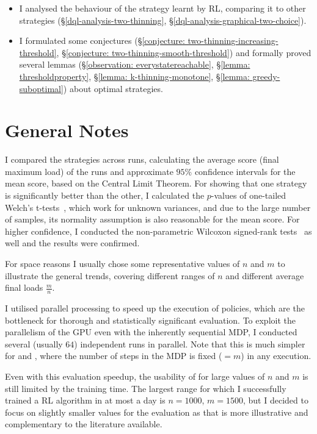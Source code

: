 \begin{itemize}
    \item 
    I analysed the behaviour of the strategy learnt by RL, comparing it to other strategies (\S\ref{dql-analysis-two-thinning}, \S\ref{dql-analysis-graphical-two-choice}).
    \item
    I formulated some conjectures (\S\ref{conjecture: two-thinning-increasing-threshold}, \S\ref{conjecture: two-thinning-smooth-threshold}) and formally proved several lemmas (\S\ref{observation: everystatereachable}, \S\ref{lemma: thresholdproperty}, \S\ref{lemma: k-thinning-monotone}, \S\ref{lemma: greedy-suboptimal}) about optimal strategies.
\end{itemize}


\section{General Notes} \label{evaluationnotes}

I compared the strategies across \NumberofRuns runs, calculating the average score (final maximum load) of the runs and approximate $95\%$ confidence intervals for the mean score, based on the Central Limit Theorem. For showing that one strategy is significantly better than the other, I calculated the $p$-values of one-tailed Welch's t-tests~\cite{welch1947ttest}, which work for unknown variances, and due to the large number of samples, its normality assumption is also reasonable for the mean score. For higher confidence, I conducted the non-parametric Wilcoxon signed-rank tests~\cite{wilcoxon1992test} as well and the results were confirmed.


For space reasons I usually chose some representative values of $n$ and $m$ to illustrate the general trends, covering different ranges of $n$ and different average final loads $\frac{m}{n}$.


I utilised parallel processing to speed up the execution of \DQL policies, which are the bottleneck for thorough and statistically significant evaluation. To exploit the parallelism of the GPU even with the inherently sequential MDP, I conducted several (usually $64$) independent runs in parallel. Note that this is much simpler for \TwoThinning and \GraphicalTwoChoice, where the number of steps in the MDP is fixed ($=m$) in any execution.


Even with this evaluation speedup, the usability of \DQL for large values of $n$ and $m$ is still limited by the training time. The largest range for which I successfully trained a RL algorithm in at most a day is $n=1000$, $m=1500$, but I decided to focus on slightly smaller values for the evaluation as that is more illustrative and complementary to the literature available.  


